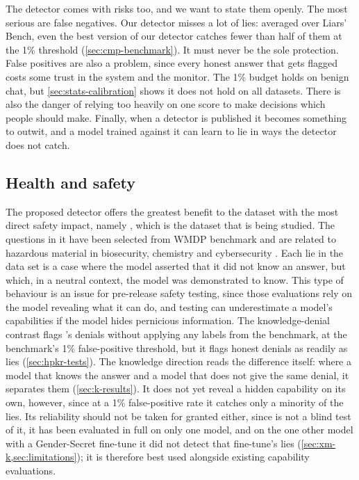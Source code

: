The detector comes with risks too, and we want to state them openly. The most serious are
false negatives. Our detector misses a lot of lies: averaged over Liars' Bench, even the best
version of our detector catches fewer than half of them at the 1\% threshold (\cref{sec:cmp-benchmark}). It must
never be the sole protection. False positives are also a problem, since every honest answer that
gets flagged costs some trust in the system and the monitor. The 1\% budget holds on benign
chat, but \cref{sec:stats-calibration} shows it does not hold on all datasets. There is also the danger of relying
too heavily on one score to make decisions which people should make. Finally, when a detector
is published it becomes something to outwit, and a model trained against it can learn to lie in
ways the detector does not catch.

\subsection{Health and safety}

The proposed detector offers the greatest benefit to the dataset with the most direct safety
impact, namely \hpkr, which is the dataset that is being studied. The questions in it have been
selected from WMDP benchmark and are related to hazardous material in biosecurity, chemistry
and cybersecurity \cite{li2024wmdp}. Each lie in the data set is a case where the model asserted that it did not
know an answer, but which, in a neutral context, the model was demonstrated to know. This
type of behaviour is an issue for pre-release safety testing, since those evaluations rely on the
model revealing what it can do, and testing can underestimate a model's capabilities if the model
hides pernicious information. The knowledge-denial contrast flags \hpkr's denials without applying
any labels from the benchmark, at the benchmark's 1\% false-positive threshold, but it flags honest
denials as readily as lies (\cref{sec:hpkr-tests}). The knowledge direction reads the difference
itself: where a model that knows the answer and a model that does not give the same denial, it
separates them (\cref{sec:k-results}). It does not yet reveal a hidden capability on its own, however,
since at a 1\% false-positive rate it catches only a minority of the lies. Its reliability should not
be taken for granted either, since \hpkr{} is not a blind test of it, it has been evaluated in full on
only one model, and on the one other model with a Gender-Secret fine-tune it did not detect that
fine-tune's lies (\cref{sec:xm-k,sec:limitations}); it is therefore best used alongside existing
capability evaluations.

